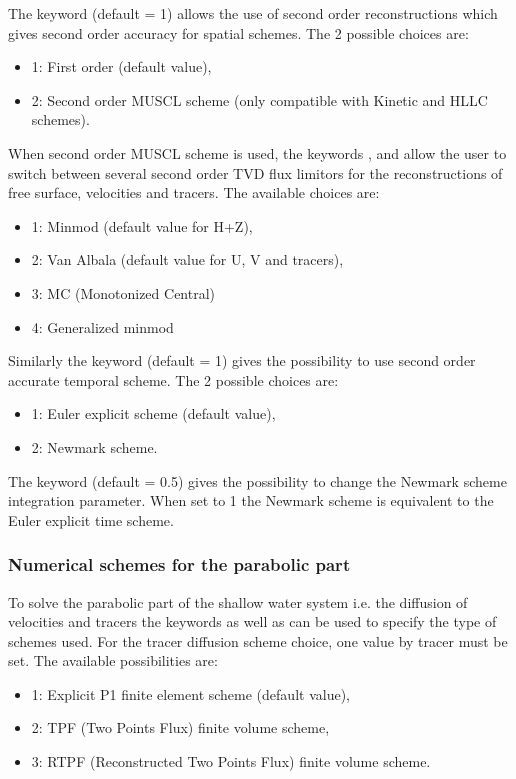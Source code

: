 The keyword  (default = 1) allows the
use of second order reconstructions which gives second order accuracy for
spatial schemes.
The 2 possible choices are:
\begin{itemize}
\item 1: First order (default value),
\item 2: Second order MUSCL scheme \cite{bristeau2005secondorder} (only compatible with
Kinetic and HLLC schemes).
\end{itemize}

When second order MUSCL scheme is used, the keywords ,
 and 
allow the user to switch between several second order TVD flux limitors for
the reconstructions of free surface, velocities and tracers.
The available choices are:
\begin{itemize}
\item 1:  Minmod (default value for H+Z),
\item 2:  Van Albala (default value for U, V and tracers),
\item 3:  MC (Monotonized Central)
\item 4:  Generalized minmod
\end{itemize}

Similarly the keyword  (default = 1)
gives the possibility to use second order accurate temporal scheme.
 The 2 possible choices are:
\begin{itemize}
\item 1: Euler explicit scheme (default value),
\item 2: Newmark scheme.
\end{itemize}
The keyword  (default = 0.5)
gives the possibility to change the Newmark scheme integration parameter.
When set to 1 the Newmark scheme is equivalent to the Euler
explicit time scheme.

\subsubsection{Numerical schemes for the parabolic part}

To solve the parabolic part of the shallow water system i.e. the diffusion of velocities
and tracers the keywords  as well as
 can be used
to specify the type of schemes used. For the tracer diffusion scheme choice, one value
by tracer must be set.
The available possibilities are:
\begin{itemize}
\item 1: Explicit P1 finite element scheme (default value),
\item 2: TPF (Two Points Flux) finite volume scheme,
\item 3: RTPF (Reconstructed Two Points Flux) finite volume scheme.
\end{itemize}

